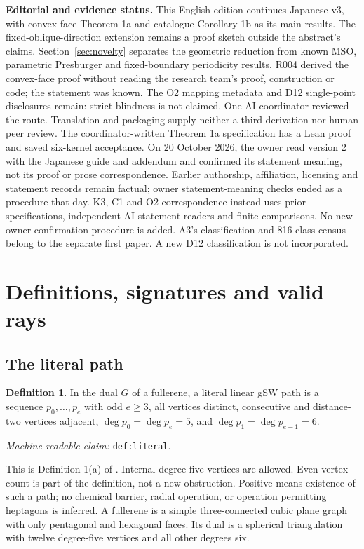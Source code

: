\documentclass[11pt]{amsart}
\newcommand{\record}[1]{\nolinkurl{#1}}
\newcommand{\claimid}[1]{\par\nopagebreak\noindent\textit{Machine-readable claim:} \record{#1}.\par}
\theoremstyle{definition}\newtheorem{definition}{Definition}
\begin{document}
\noindent\textbf{Editorial and evidence status.}
This English edition continues Japanese v3, with convex-face Theorem 1a
and catalogue Corollary 1b as its main results. The fixed-oblique-direction
extension remains a proof sketch outside the abstract's claims.
Section~\ref{sec:novelty} separates the geometric reduction from known
MSO, parametric Presburger and fixed-boundary periodicity results.
R004 derived the convex-face proof without reading the research team's
proof, construction or code; the statement was known. The O2 mapping
metadata and D12 single-point disclosures remain: strict blindness is
not claimed. One AI coordinator reviewed the route. Translation and
packaging supply neither a third derivation nor human peer review.
The coordinator-written Theorem 1a specification has a Lean proof and
saved six-kernel acceptance. On 20 October 2026, the owner read version 2
with the Japanese guide and addendum and confirmed its statement meaning,
not its proof or prose correspondence. Earlier authorship, affiliation,
licensing and statement records remain factual; owner statement-meaning
checks ended as a procedure that day. K3, C1 and O2 correspondence instead
uses prior specifications, independent AI statement readers and finite
comparisons. No new owner-confirmation procedure is added. A3's
classification and 816-class census belong to the separate first paper.
A new D12 classification is not incorporated.

\clearpage
\section{Definitions, signatures and valid rays}\label{sec:definitions}
\subsection{The literal path}
\begin{definition}\label{def:literal}
In the dual $G$ of a fullerene, a literal linear gSW path is a sequence
$p_0,\ldots,p_e$ with odd $e\ge3$, all vertices distinct, consecutive
and distance-two vertices adjacent, $\deg p_0=\deg p_e=5$, and
$\deg p_1=\deg p_{e-1}=6$.
\end{definition}
\claimid{def:literal}
This is Definition 1(a) of \cite{BBS}. Internal degree-five vertices
are allowed. Even vertex count is part of the definition, not a new
obstruction. Positive means existence of such a path; no chemical
barrier, radial operation, or operation permitting heptagons is inferred.
A fullerene is a simple three-connected cubic plane graph with only
pentagonal and hexagonal faces. Its dual is a spherical triangulation
with twelve degree-five vertices and all other degrees six.
\end{document}
